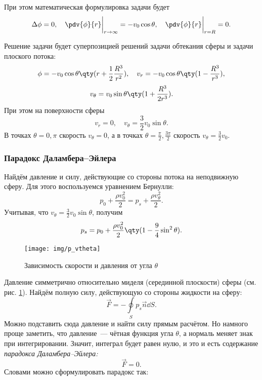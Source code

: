 При этом математическая формулировка задачи будет
\begin{equation}
    \Delta \phi = 0, \quad
    \pdv{\phi}{r}\bigg|_{r\to \infty} = -v_0 \cos\theta, \quad
    \pdv{\phi}{r}\bigg|_{r=R} = 0.
\end{equation}

Решение задачи будет суперпозицией решений задачи обтекания сферы и задачи плоского потока:
\begin{equation}
    \phi = -v_0 \cos\theta \qty(r+\frac{1}{2}\frac{R^3}{r^2}), \quad
    v_r = -v_0\cos\theta \qty(1-\frac{R^3}{r^3}),
\end{equation}
\begin{equation}
	v_\theta = v_0\sin\theta \qty(1+\frac{R^3}{2r^3}).
\end{equation}
При этом на поверхности сферы
\begin{equation}
    v_r = 0, \quad
    v_\theta = \frac{3}{2}v_0\sin\theta.
\end{equation}
В точках $\theta=0,\pi$ скорость $v_\theta=0$, а в точках $\theta=\frac{\pi}{2}, \frac{3\pi}{2}$ скорость $v_\theta=\frac{3}{2}v_0$.

\subsubsection{Парадокс Даламбера--Эйлера} Найдём давление и силу, действующие со стороны потока на неподвижную сферу. Для этого воспользуемся уравнением Бернулли:
\begin{equation}
    p_0 + \frac{\rho v_0^2}{2} =
    p_s + \frac{\rho v_\theta^2}{2}.
\end{equation}
Учитывая, что $v_\theta=\frac{3}{2}v_0\sin\theta$, получим
\begin{equation}
    p_s = p_0 + \frac{\rho v_0^2}{2}\qty(1-\frac{9}{4}\sin^2\theta).
\end{equation}
\begin{figure}[H]
    \centering
    \texttt{[image: img/p\_vtheta]}
    \caption{Зависимость скорости и давления от угла $\theta$}
    \label{fig:pandv}
\end{figure}
Давление симметрично относительно миделя (серединной плоскости) сферы (см. рис. \ref{fig:pandv}). Найдём полную силу, действующую со стороны жидкости на сферу:
\begin{equation}
    \vec{F} = - \oint\limits_S p_s \vec{n} \dd{S}.
\end{equation}
Можно подставить сюда давление и найти силу прямым расчётом.
Но намного проще  заметить, что давление~--- чётная функция угла $\theta$, а нормаль меняет знак при интегрировании.
Значит, интеграл будет равен нулю, и это и есть содержание \textit{парадокса Даламбера--Эйлера:}
 \begin{equation}
     \vec{F}=0.
 \end{equation}
Словами можно сформулировать парадокс так:

